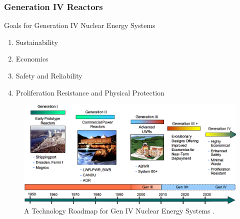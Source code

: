\documentclass[9pt]{beamer}
\begin{document}
\begin{frame}
  \frametitle{Generation IV Reactors}
              \begin{block}{Goals for Generation IV Nuclear Energy Systems \cite{ABRAM2008}}
               \begin{enumerate}
                \item Sustainability
                \item Economics
                \item Safety and Reliability
                \item Proliferation Resistance and Physical Protection
               \end{enumerate}
               \end{block}
               \begin{figure}[t]
                \vspace*{-0.1in}
                \includegraphics[height=0.4\textwidth]{./images/gen4_road_map.png}
                \vspace*{-0.1in}
                \caption{A Technology Roadmap for Gen IV Nuclear Energy Systems \cite{ABRAM2008}.}
               \end{figure}
              
\end{frame}
\end{document}
